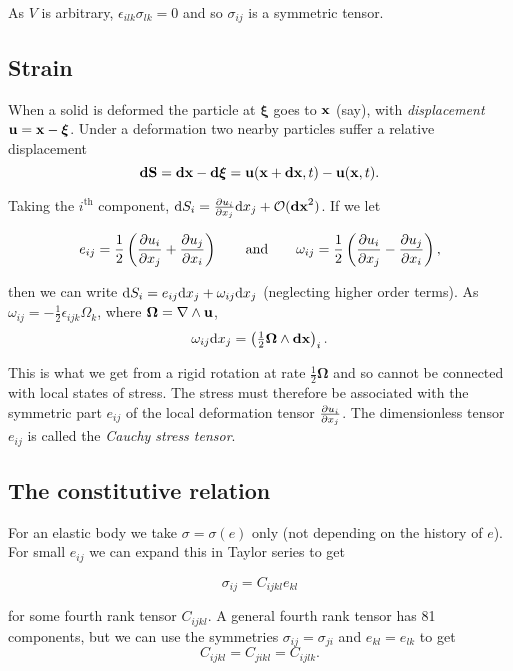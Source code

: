 \documentclass{notes}
\newcommand{\bs}[1]{\boldsymbol{#1}}
\newcommand{\cO}{\mathcal{O}}
\begin{document}
As $V$ is arbitrary, $ \epsilon_{ilk} \sigma_{lk} = 0$ and so
$\sigma_{ij}$ is a symmetric tensor.

\subsection{Strain}

When a solid is deformed the particle at $\bs \xi$ goes to $\mathbf{x}$ (say),
with \emph{displacement} $\vu = \vx - \bs \xi$.  Under a deformation
two nearby particles suffer a relative displacement
\[
\vect{dS} = \vect{dx} - \vect{d\bs\xi} = \vu(\vx + \vect{dx},t)
- \vu(\vx,t).
\]

Taking the $i^{\text{th}}$ component,
$\ud S_i = \pd{u_i}{x_j} \ud x_j + \cO(\vect{dx}^2)$.  If we let

\begin{equation}\label{eq:solid:strain}
e_{ij} = \frac{1}{2} \left( \frac{\partial u_i}{\partial x_j} + \frac{\partial u_j}{\partial x_i} \right) \qquad
\text{and} \qquad
\omega_{ij} = \frac{1}{2} \left( \frac{\partial u_i}{\partial x_j} - \frac{\partial u_j}{\partial x_i} \right),
\end{equation}

then we can write $\mathrm{d} S_i = e_{ij}\mathrm{d} x_j + \omega_{ij} \mathrm{d} x_j$
(neglecting higher order terms).
As $\omega_{ij} = -\tfrac{1}{2} \epsilon_{ijk} \Omega_k$,
where $\bs \Omega = \nabla \wedge \vu$,
\[
\omega_{ij}\ud x_j = \left(\tfrac{1}{2} \bs \Omega \wedge \vect{dx} \right)_i.
\]

This is what we get from a rigid rotation at rate $\tfrac{1}{2} \bs \Omega$
and so cannot be connected with local states of stress.  The stress
must therefore be associated with the symmetric part $e_{ij}$ of the
local deformation tensor $\frac{\partial u_i}{\partial x_j}$.  The dimensionless
tensor $e_{ij}$ is called the \emph{Cauchy stress tensor}.

\subsection{The constitutive relation}

For an elastic body we take $\sigma = \sigma(e)$ only (not depending
on the history of $e$).  For small $e_{ij}$ we can expand this in
Taylor series to get

\[
\sigma_{ij} = C_{ijkl} e_{kl}
\]

for some fourth rank tensor $C_{ijkl}$. A general fourth rank tensor
has 81 components, but we can use the symmetries
$\sigma_{ij} = \sigma_{ji}$ and $e_{kl} = e_{lk}$ to get
\[
C_{ijkl} = C_{jikl} = C_{ijlk}.
\]
\end{document}
